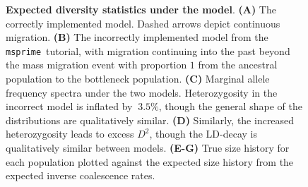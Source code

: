 \documentclass{article}
\newcommand{\msprime}[0]{\texttt{msprime}}
\begin{document}
\begin{figure}[ht]
\begin{center}
\caption{\textbf{Expected diversity statistics under the \citet{gutenkunst2009inferring} model}.
    \textbf{(A)} The correctly implemented model. Dashed arrows depict continuous migration.
    \textbf{(B)} The incorrectly implemented model from the \msprime\ tutorial, with migration continuing
    into the past beyond the mass migration event with proportion $1$ from the ancestral population
    to the bottleneck population.
    \textbf{(C)} Marginal allele frequency spectra under the two models. Heterozygosity in the incorrect model
    is inflated by $~3.5\%$, though the general shape of the distributions are qualitatively similar.
    \textbf{(D)} Similarly, the increased heterozygosity leads to excess $D^2$, though the LD-decay is
    qualitatively similar between models.
    \textbf{(E-G)} True size history for each population plotted against the expected size history from
    the expected inverse coalescence rates.
}
\label{fig:ooa_stats}
\end{center}
\end{figure}
\end{document}
